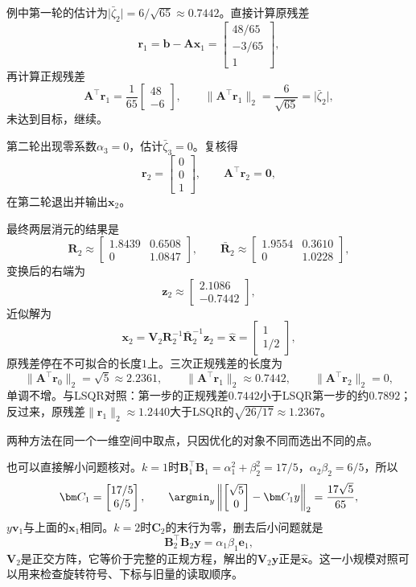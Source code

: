 \begin{enumerate}
 例中第一轮的估计为$\lvert\bar\zeta_2\rvert=6/\sqrt{65}\approx0.7442$。直接计算原残差
 \[
  \bm r_1=\bm b-\bm A\bm x_1=\begin{bmatrix}48/65\\-3/65\\1\end{bmatrix},
 \]
 再计算正规残差
 \[
  \bm A^\top\bm r_1=\frac1{65}\begin{bmatrix}48\\-6\end{bmatrix},\qquad
  \lVert\bm A^\top\bm r_1\rVert_2=\frac6{\sqrt{65}}=\lvert\bar\zeta_2\rvert ,
 \]
 未达到目标，继续。

 第二轮出现零系数$\alpha_3=0$，估计$\bar\zeta_3=0$。复核得
 \[
  \bm r_2=\begin{bmatrix}0\\0\\1\end{bmatrix},\qquad \bm A^\top\bm r_2=\bm0 ,
 \]
 在第二轮退出并输出$\bm x_2$。
\end{enumerate}

最终两层消元的结果是
\[
 \bm R_2\approx\begin{bmatrix}1.8439&0.6508\\0&1.0847\end{bmatrix},\qquad
 \bar{\bm R}_2\approx\begin{bmatrix}1.9554&0.3610\\0&1.0228\end{bmatrix},
\]
变换后的右端为
\[
 \bm z_2\approx\begin{bmatrix}2.1086\\-0.7442\end{bmatrix},
\]
近似解为
\[
 \bm x_2=\bm V_2\bm R_2^{-1}\bar{\bm R}_2^{-1}\bm z_2=\hat{\bm x}=\begin{bmatrix}1\\1/2\end{bmatrix},
\]
原残差停在不可拟合的长度$1$上。三次正规残差的长度为
\[
 \lVert\bm A^\top\bm r_0\rVert_2=\sqrt5\approx2.2361,\qquad
 \lVert\bm A^\top\bm r_1\rVert_2\approx0.7442,\qquad
 \lVert\bm A^\top\bm r_2\rVert_2=0 ,
\]
单调不增。与LSQR对照：第一步的正规残差$0.7442$小于LSQR第一步的约$0.7892$；反过来，原残差$\lVert\bm r_1\rVert_2\approx1.2440$大于LSQR的$\sqrt{26/17}\approx1.2367$。

两种方法在同一个一维空间中取点，只因优化的对象不同而选出不同的点。

也可以直接解小问题核对。$k=1$时$\bm B_1^\top\bm B_1=\alpha_1^2+\beta_2^2=17/5$，$\alpha_2\beta_2=6/5$，所以
\[
 \bm C_1=\begin{bmatrix}17/5\\6/5\end{bmatrix},\qquad
 \argmin_y\left\lVert\begin{bmatrix}\sqrt5\\0\end{bmatrix}-\bm C_1y\right\rVert_2=\frac{17\sqrt5}{65},
\]
$y\bm v_1$与上面的$\bm x_1$相同。$k=2$时$\bm C_2$的末行为零，删去后小问题就是
\[
 \bm B_2^\top\bm B_2\bm y=\alpha_1\beta_1\bm e_1 ,
\]
$\bm V_2$是正交方阵，它等价于完整的正规方程，解出的$\bm V_2\bm y$正是$\hat{\bm x}$。这一小规模对照可以用来检查旋转符号、下标与旧量的读取顺序。

